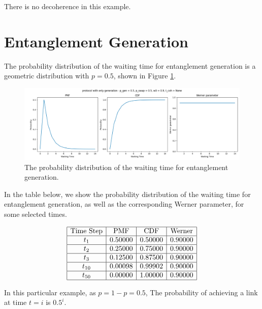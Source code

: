 \documentclass{masterthesis}
\begin{document}
There is no decoherence in this example.

\section*{Entanglement Generation}

The probability distribution of the waiting time for entanglement generation is a geometric distribution with $p = 0.5$, shown in Figure \ref{fig:gen_waiting_time}.
\begin{figure}[ht]
    \centering
    \includegraphics[width=1\linewidth]{images/dist_tests/only generation.png}
    \caption{The probability distribution of the waiting time for entanglement generation.}
    \label{fig:gen_waiting_time}
\end{figure}

In the table below, we show the probability distribution of the waiting time for entanglement generation, as well as the corresponding Werner parameter, for some selected times.

\begin{equation*}
    \begin{array}{|c|c|c|c|}
        \hline
        \text{Time Step} & \text{PMF} & \text{CDF} & \text{Werner} \\
        \hline
        t_1 & 0.50000 & 0.50000 & 0.90000 \\
        \hline
        t_2 & 0.25000 & 0.75000 & 0.90000 \\
        \hline
        t_3 & 0.12500 & 0.87500 & 0.90000 \\
        \hline
        t_{10} & 0.00098 & 0.99902 & 0.90000 \\
        \hline
        t_{50} & 0.00000 & 1.00000 & 0.90000 \\
        \hline
    \end{array}
    \label{tab:gen_waiting_time}
\end{equation*}

In this particular example, as $ p = 1 - p = 0.5$, The probability of achieving a link at time $t = i$ is $0.5^i$.
\end{document}
